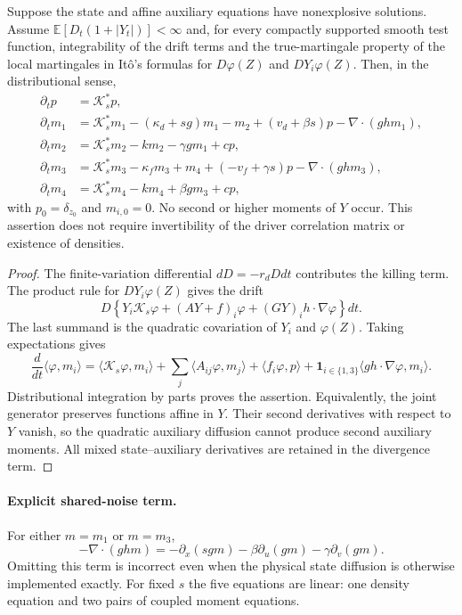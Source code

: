 \begin{thm}\label{thm: momentClosure}
Suppose the state and affine auxiliary equations have nonexplosive solutions.
Assume $\mathbb E[D_t(1+|Y_t|)]<\infty$ and, for every compactly supported
smooth test function, integrability of the drift terms and the true-martingale
property of the local martingales in It\^o's formulas for
$D\varphi(Z)$ and $DY_i\varphi(Z)$. Then, in the distributional sense,
\begin{align}
\partial_t p&=\mathcal K_s^*p,\label{eq: closureFive}\\
\partial_t m_1&=\mathcal K_s^*m_1-(\kappa_d+sg)m_1-m_2
 +(v_d+\beta s)p-\nabla\cdot(ghm_1),\nonumber\\
\partial_t m_2&=\mathcal K_s^*m_2-km_2-\gamma gm_1+cp,\nonumber\\
\partial_t m_3&=\mathcal K_s^*m_3-\kappa_fm_3+m_4
 +(-v_f+\gamma s)p-\nabla\cdot(ghm_3),\nonumber\\
\partial_t m_4&=\mathcal K_s^*m_4-km_4+\beta gm_3+cp,\nonumber
\end{align}
with $p_0=\delta_{z_0}$ and $m_{i,0}=0$.
No second or higher moments of $Y$ occur. This assertion does not require
invertibility of the driver correlation matrix or existence of densities.
\end{thm}
\begin{proof}
The finite-variation differential $dD=-r_dDdt$ contributes the killing term.
The product rule for $DY_i\varphi(Z)$ gives the drift
\[
D\left\{Y_i\mathcal K_s\varphi+(AY+f)_i\varphi
            +(GY)_i h\cdot\nabla\varphi\right\}dt.
\]
The last summand is the quadratic covariation of $Y_i$ and $\varphi(Z)$.
Taking expectations gives
\[
\frac{d}{dt}\langle\varphi,m_i\rangle
=\langle\mathcal K_s\varphi,m_i\rangle+
\sum_j\langle A_{ij}\varphi,m_j\rangle+\langle f_i\varphi,p\rangle
+\mathbf1_{i\in\{1,3\}}\langle gh\cdot\nabla\varphi,m_i\rangle.
\]
Distributional integration by parts proves the assertion. Equivalently, the
joint generator preserves functions affine in $Y$. Their second derivatives
with respect to $Y$ vanish, so the quadratic auxiliary diffusion cannot produce
second auxiliary moments. All mixed state--auxiliary derivatives are retained
in the divergence term.
\end{proof}

\paragraph{Explicit shared-noise term.}
For either $m=m_1$ or $m=m_3$,
\[
-\nabla\cdot(ghm)=-\partial_x(sgm)-\beta\partial_u(gm)
                                      -\gamma\partial_v(gm).
\]
Omitting this term is incorrect even when the physical state diffusion is
otherwise implemented exactly. For fixed $s$ the five equations are linear:
one density equation and two pairs of coupled moment equations.

